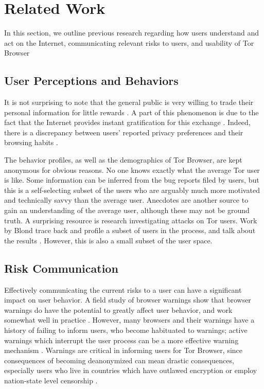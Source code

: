 
\section{Related Work}
In this section, we outline previous research regarding how users understand and act on the Internet, communicating relevant risks to users, and usability of Tor Browser

\subsection{User Perceptions and Behaviors}
It is not surprising to note that the general public is very willing to trade their personal information for little rewards \cite{norberg2007privacy}. A part of this phenomenon is due to the fact that the Internet provides instant gratification for this exchange \cite{acquisti2004privacy}. Indeed, there is a discrepancy between users' reported privacy preferences and their browsing habits \cite{jensen2005privacy}. 

The behavior profiles, as well as the demographics of Tor Browser, are kept anonymous for obvious reasons. No one knows exactly what the average Tor user is like. Some information can be inferred from the bug reports filed by users, but this is a self-selecting subset of the users who are arguably much more motivated and technically savvy than the average user. Anecdotes are another source to gain an understanding of the average user, although these may not be ground truth. A surprising resource is research investigating attacks on Tor users. Work by Blond trace back and profile a subset of users in the process, and talk about the results \cite{blond2011one}. However, this is also a small subset of the user space.  

\subsection{Risk Communication}
Effectively communicating the current risks to a user can have a significant impact on user behavior. A field study of browser warnings show that browser warnings do have the potential to greatly affect user behavior, and work somewhat well in practice \cite{akhawe2013alice}. However, many browsers and their warnings have a history of failing to inform users, who become habituated to warnings; active warnings which interrupt the user process can be a more effective warning mechanism \cite{egelman2008you}. Warnings are critical in informing users for Tor Browser, since consequences of becoming deanonymized can mean drastic consequences, especially users who live in countries which have outlawed encryption or employ nation-state level censorship \cite{crypto_wikipedia_2015,china_wikipedia_2015}. 


